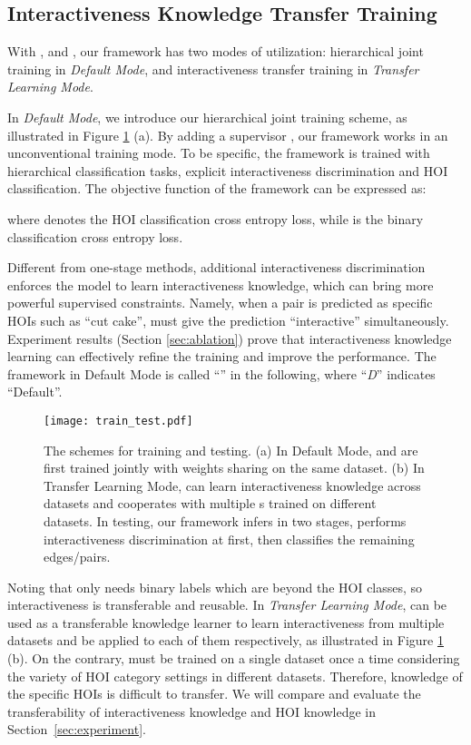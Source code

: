 \documentclass[10pt,twocolumn,letterpaper]{article}
\begin{document}
\subsection{Interactiveness Knowledge Transfer Training}
\label{sec:train-test}
With ,  and , our framework has two modes of utilization: hierarchical joint training in \emph{Default Mode}, and interactiveness transfer training in \emph{Transfer Learning Mode}.

 In \emph{Default Mode}, we introduce our hierarchical joint training scheme, as illustrated in Figure \ref{Figure:train-test} (a). By adding a supervisor , our framework works in an unconventional training mode. 
To be specific, the framework is trained with hierarchical classification tasks, \ie explicit interactiveness discrimination and HOI classification.
The objective function of the framework can be expressed as:

where  denotes the HOI classification cross entropy loss, while  is the binary classification cross entropy loss.

Different from one-stage methods, additional interactiveness discrimination enforces the model to learn interactiveness knowledge, which can bring more powerful supervised constraints. Namely, when a pair is predicted as specific HOIs such as ``cut cake'',  must give the prediction ``interactive'' simultaneously. 
Experiment results (Section \ref{sec:ablation}) prove that interactiveness knowledge learning can effectively refine the training and improve the performance. 
The framework in Default Mode is called ``'' in the following, where ``\emph{D}'' indicates ``Default''.
\begin{figure}[!ht]
	\begin{center}
		\texttt{[image: train\_test.pdf]}
	\end{center}
	\caption{The schemes for training and testing. 
	(a) In Default Mode,  and  are first trained jointly with weights sharing on the same dataset.
	(b) In Transfer Learning Mode,  can learn interactiveness knowledge across datasets and cooperates with multiple s trained on different datasets. 
	In testing, our framework infers in two stages, \ie  performs interactiveness discrimination at first, then  classifies the remaining edges/pairs.}
	\label{Figure:train-test}
	\vspace{-0.3cm}
\end{figure}

 Noting that  only needs binary labels which are beyond the HOI classes, so interactiveness is transferable and reusable. In \emph{Transfer Learning Mode},  can be used as a transferable knowledge learner to learn interactiveness from multiple datasets and be applied to each of them respectively, as illustrated in Figure \ref{Figure:train-test} (b). On the contrary,  must be trained on a single dataset once a time considering the variety of HOI category settings in different datasets. Therefore, knowledge of the specific HOIs is difficult to transfer. We will compare and evaluate the transferability of interactiveness knowledge and HOI knowledge in Section~\ref{sec:experiment}.
\end{document}
